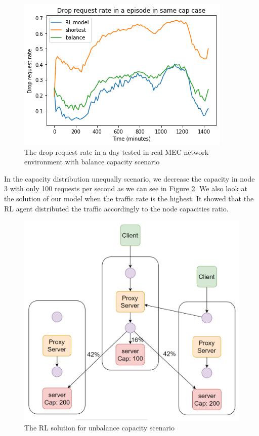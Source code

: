 \documentclass[conference]{IEEEtran}
\begin{document}
\begin{figure}[]
    \centering
    \includegraphics[scale = 0.5]{imgs/balance_capacity_scenario_result.png}
    \caption{The drop request rate in a day tested in real MEC network environment with balance capacity scenario}
    \label{fig:balance_capacity_scenario_result}
\end{figure}

In the capacity distribution unequally scenario, we decrease the capacity in node 3 with only 100 requests per second as we can see in Figure \ref{fig:unbalance_capacity_RL_solution}. We also look at the solution of our model when the traffic rate is the highest. It showed that the RL agent distributed the traffic accordingly to the node capacities ratio.

\begin{figure}[]
    \centering
    \includegraphics[scale = 0.5]{imgs/unbalance_capacity_RL_solution.png}
    \caption{The RL solution for unbalance capacity scenario}
    \label{fig:unbalance_capacity_RL_solution}
\end{figure}
\end{document}
